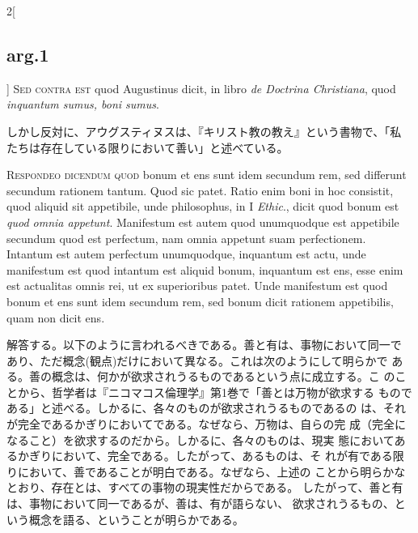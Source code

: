 \documentclass[paper=a4paper,fontsize=10pt,jafontsize=9pt,titlepage]{jlreq}
\begin{document}
\begin{paracol}{2}[\subsection{arg.1}]
{\scshape Sed contra est} quod Augustinus dicit, in libro {\itshape de
 Doctrina Christiana}, quod {\itshape inquantum sumus, boni sumus}.

\switchcolumn

しかし反対に、アウグスティヌスは、『キリスト教の教え』という書物で、「私
 たちは存在している限りにおいて善い」と述べている。


{\scshape Respondeo dicendum quod} bonum et ens sunt idem secundum rem,
 sed differunt secundum rationem tantum. Quod sic patet. Ratio enim boni
 in hoc consistit, quod aliquid sit appetibile, unde philosophus, in I
 {\itshape Ethic}., dicit quod bonum est {\itshape quod omnia appetunt}. Manifestum est autem
 quod unumquodque est appetibile secundum quod est perfectum, nam omnia
 appetunt suam perfectionem. Intantum est autem perfectum unumquodque,
 inquantum est actu, unde manifestum est quod intantum est aliquid
 bonum, inquantum est ens, esse enim est actualitas omnis rei, ut ex
 superioribus patet. Unde manifestum est quod bonum et ens sunt idem
 secundum rem, sed bonum dicit rationem appetibilis, quam non dicit ens.

\switchcolumn

解答する。以下のように言われるべきである。善と有は、事物において同一で
 あり、ただ概念(観点)だけにおいて異なる。これは次のようにして明らかで
 ある。善の概念は、何かが欲求されうるものであるという点に成立する。こ
 のことから、哲学者は『ニコマコス倫理学』第1巻で「善とは万物が欲求する
 ものである」と述べる。しかるに、各々のものが欲求されうるものであるの
 は、それが完全であるかぎりにおいてである。なぜなら、万物は、自らの完
 成（完全になること）を欲求するのだから。しかるに、各々のものは、現実
 態においてあるかぎりにおいて、完全である。したがって、あるものは、そ
 れが有である限りにおいて、善であることが明白である。なぜなら、上述の
 ことから明らかなとおり、存在とは、すべての事物の現実性だからである。
 したがって、善と有は、事物において同一であるが、善は、有が語らない、
 欲求されうるもの、という概念を語る、ということが明らかである。

\switchcolumn*[\subsection{ad.1}]


\end{paracol}
\end{document}
